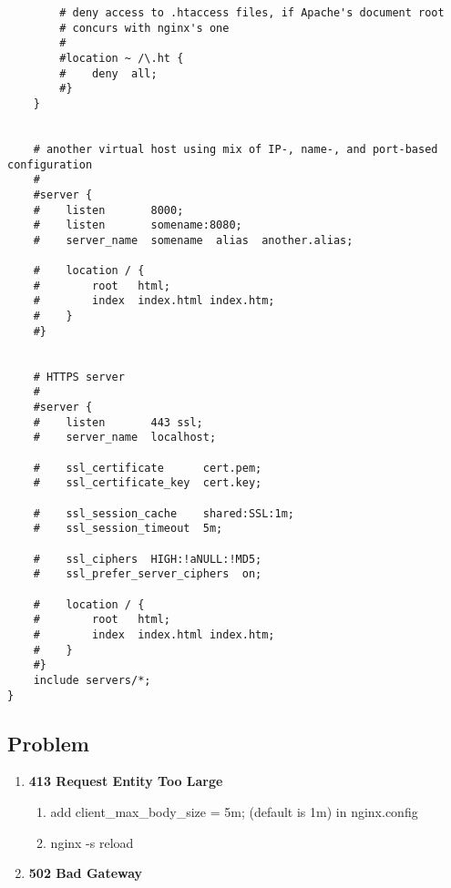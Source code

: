 \begin{lstlisting}
        # deny access to .htaccess files, if Apache's document root
        # concurs with nginx's one
        #
        #location ~ /\.ht {
        #    deny  all;
        #}
    }


    # another virtual host using mix of IP-, name-, and port-based configuration
    #
    #server {
    #    listen       8000;
    #    listen       somename:8080;
    #    server_name  somename  alias  another.alias;

    #    location / {
    #        root   html;
    #        index  index.html index.htm;
    #    }
    #}


    # HTTPS server
    #
    #server {
    #    listen       443 ssl;
    #    server_name  localhost;

    #    ssl_certificate      cert.pem;
    #    ssl_certificate_key  cert.key;

    #    ssl_session_cache    shared:SSL:1m;
    #    ssl_session_timeout  5m;

    #    ssl_ciphers  HIGH:!aNULL:!MD5;
    #    ssl_prefer_server_ciphers  on;

    #    location / {
    #        root   html;
    #        index  index.html index.htm;
    #    }
    #}
    include servers/*;
}

        \end{lstlisting}
        
    \subsection{Problem}
        \begin{enumerate}
            \item \textbf{413 Request Entity Too Large} \\
                \begin{enumerate}[(1)]
                    \item add \colorbox{gray!30}{client\_max\_body\_size = 5m;} (default is 1m) in nginx.config
                    \item \colorbox{gray!30}{nginx -s reload}
                \end{enumerate}
            \item \textbf{502 Bad Gateway}
        \end{enumerate}
    

